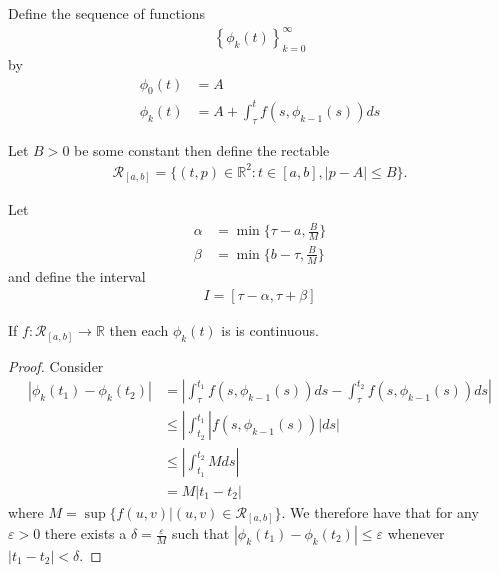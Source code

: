 \documentclass{unswmaths}
\begin{document}
Define the sequence of functions 
\begin{align}
	\label{def:Succ_Approx_Seq}
	\left\{ \phi_k (t) \right\}_{k=0}^{\infty}
\end{align}
by 
\begin{align*}
	\phi_0(t) &= A \\  
	\phi_k(t) &= A + \int_\tau^t f(s,\phi_{k-1}(s))ds
\end{align*}

Let $ B > 0 $ be some constant then define the rectable 
\begin{align}
	\label{def:Rectangle}
	\mathcal{R}_{[a,b]} = \{ (t,p) \in \mathbb{R}^2 : t \in [a,b], |p-A| \leq B \}. 
\end{align}

Let
\begin{align*}
	\alpha 	&= \min\{\tau - a, \frac{B}{M} \} \\
	\beta	&= \min\{b - \tau, \frac{B}{M} \}
\end{align*}
and define the interval 
\begin{align}
	\label{def:Interval}
	I = [ \tau - \alpha, \tau + \beta ]
\end{align}
\begin{unswlem}
	If $ f : \mathcal{R}_{[a,b]} \longrightarrow \mathbb{R} $ then each $ \phi_k(t) $ is is continuous.
\end{unswlem}
\begin{proof}
	Consider 
	\begin{align*}
		| \phi_k (t_1) - \phi_k (t_2) | 	&= | \int_\tau^{t_1} f(s,\phi_{k-1}(s))ds - \int_\tau^{t_2} f(s,\phi_{k-1}(s))ds | \\
							&\leq | \int_{t_2}^{t_1} | f(s, \phi_{k-1}(s)) | ds | \\
							&\leq | \int_{t_1}^{t_2} M ds | \\
							&= M|t_1 - t_2|
	\end{align*}
	where $ M = \sup\{f(u,v) | (u,v) \in \mathcal{R}_{[a,b]} \} $.
	We therefore have that for any $ \varepsilon > 0 $ there exists a $ \delta = \frac{\varepsilon}{M} $ such that 
	$ | \phi_k (t_1) - \phi_k (t_2) | \leq \varepsilon $ whenever $ | t_1 - t_2 | < \delta $.
\end{proof}
\end{document}
